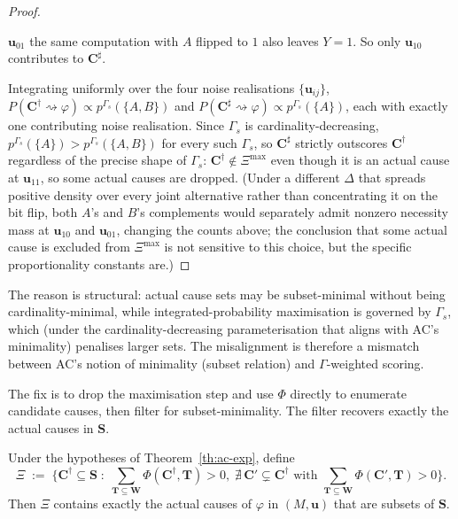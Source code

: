 \begin{proof}
\begin{itemize}
$\mathbf{u}_{01}$ the same computation with $A$ flipped to $1$ also leaves $Y=1$.
So only $\mathbf{u}_{10}$ contributes to $\mathbf{C}^\sharp$.
\end{itemize}
Integrating uniformly over the four noise realisations $\{\mathbf{u}_{ij}\}$,
$P(\mathbf{C}^\dagger\!\rightsquigarrow\!\varphi)\propto p^{\Gamma_s}(\{A,B\})$ and
$P(\mathbf{C}^\sharp\!\rightsquigarrow\!\varphi)\propto p^{\Gamma_s}(\{A\})$, each
with exactly one contributing noise realisation. Since $\Gamma_s$ is
cardinality-decreasing, $p^{\Gamma_s}(\{A\})>p^{\Gamma_s}(\{A,B\})$ for every such
$\Gamma_s$, so $\mathbf{C}^\sharp$ strictly outscores $\mathbf{C}^\dagger$
regardless of the precise shape of $\Gamma_s$: $\mathbf{C}^\dagger\notin\Xi^{\max}$
even though it is an actual cause at $\mathbf{u}_{11}$, so some actual causes are
dropped. (Under a different $\Delta$ that spreads positive density over every
joint alternative rather than concentrating it on the bit flip, both $A$'s and
$B$'s complements would separately admit nonzero necessity mass at
$\mathbf{u}_{10}$ and $\mathbf{u}_{01}$, changing the counts above; the
conclusion that some actual cause is excluded from $\Xi^{\max}$ is not
sensitive to this choice, but the specific proportionality constants are.)
\end{proof}

The reason is structural: actual cause sets may be subset-minimal without being
cardinality-minimal, while integrated-probability maximisation is governed by
$\Gamma_s$, which (under the cardinality-decreasing parameterisation that aligns with
AC's minimality) penalises larger sets. The misalignment is therefore a mismatch between AC's notion of minimality (subset
relation) and $\Gamma$-weighted scoring.

The fix is to drop the maximisation step and use $\Phi$ directly to enumerate
candidate causes, then filter for subset-minimality. The filter recovers exactly the
actual causes in $\mathbf{S}$.

\begin{proposition}\label{prop:filter}
Under the hypotheses of Theorem~\ref{th:ac-exp}, define
\[
\Xi \;:=\; \Big\{\mathbf{C}^\dagger\subseteq\mathbf{S}\;:\;
\sum_{\mathbf{T}\subseteq\mathbf{W}} \Phi(\mathbf{C}^\dagger,\mathbf{T})>0,\;
\nexists\,\mathbf{C}'\subsetneq\mathbf{C}^\dagger\text{ with }
\sum_{\mathbf{T}\subseteq\mathbf{W}} \Phi(\mathbf{C}',\mathbf{T})>0
\Big\}.
\]
Then $\Xi$ contains exactly the actual causes of $\varphi$ in $(M,\mathbf{u})$ that are
subsets of $\mathbf{S}$.
\end{proposition}

